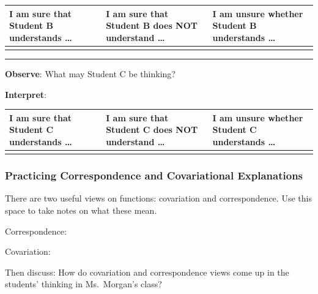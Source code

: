\documentclass[11pt]{article}
\newcommand{\handout}{\subsubsection}
\theoremstyle{definition}
\begin{document}
\begin{tabular}{C{1.75in}|C{1.75in}|C{1.75in}}
I am sure that Student B understands \dots  & I am sure that Student B
does NOT understand \dots & I am unsure whether
Student B understands \dots  \\ \hline
& & \vspace*{1.75in}\\
\end{tabular}

\vspace*{2pt}
\hrule
\vspace*{2pt}

{\bf Observe}: What may Student C be thinking?

{\bf Interpret}: 

\begin{tabular}{C{1.75in}|C{1.75in}|C{1.75in}}
I am sure that Student C understands \dots  & I am sure that Student C
does NOT understand \dots & I am unsure whether
Student C understands \dots  \\ \hline
& & \vspace*{1.75in}\\
\end{tabular}

\newpage
\handout{Practicing Correspondence and Covariational Explanations}

There are two useful views on functions: covariation and correspondence. Use this space to take notes on what these mean.

Correspondence: 

Covariation: 

Then discuss: How do covariation and correspondence views come up in the students' thinking in Ms.~Morgan's class?

\newpage
\end{document}
